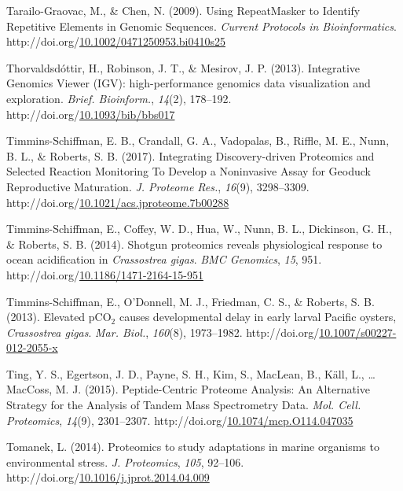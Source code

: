 \documentclass [11pt, proquest] {uwthesis}[2015/03/03]
\newlength{\cslhangindent}
\newenvironment{CSLReferences}%
{\setlength{\parindent}{0pt}%
\everypar{\setlength{\hangindent}{\cslhangindent}}\ignorespaces}%
{\par}
\begin{document}
\begin{CSLReferences}{1}{0}
\leavevmode\hypertarget{ref-Tarailo-Graovac2009}{}%
Tarailo-Graovac, M., \& Chen, N. (2009). {Using RepeatMasker to Identify Repetitive Elements in Genomic Sequences}. \emph{Current Protocols in Bioinformatics}. http://doi.org/\href{https://doi.org/10.1002/0471250953.bi0410s25}{10.1002/0471250953.bi0410s25}

\leavevmode\hypertarget{ref-Thorvaldsdottir2013}{}%
Thorvaldsdóttir, H., Robinson, J. T., \& Mesirov, J. P. (2013). {Integrative Genomics Viewer (IGV): high-performance genomics data visualization and exploration}. \emph{Brief. Bioinform.}, \emph{14}(2), 178--192. http://doi.org/\href{https://doi.org/10.1093/bib/bbs017}{10.1093/bib/bbs017}

\leavevmode\hypertarget{ref-Timmins-Schiffman2017}{}%
Timmins-Schiffman, E. B., Crandall, G. A., Vadopalas, B., Riffle, M. E., Nunn, B. L., \& Roberts, S. B. (2017). {Integrating Discovery-driven Proteomics and Selected Reaction Monitoring To Develop a Noninvasive Assay for Geoduck Reproductive Maturation}. \emph{J. Proteome Res.}, \emph{16}(9), 3298--3309. http://doi.org/\href{https://doi.org/10.1021/acs.jproteome.7b00288}{10.1021/acs.jproteome.7b00288}

\leavevmode\hypertarget{ref-Timmins-Schiffman2014}{}%
Timmins-Schiffman, E., Coffey, W. D., Hua, W., Nunn, B. L., Dickinson, G. H., \& Roberts, S. B. (2014). {Shotgun proteomics reveals physiological response to ocean acidification in \emph{Crassostrea gigas}}. \emph{BMC Genomics}, \emph{15}, 951. http://doi.org/\href{https://doi.org/10.1186/1471-2164-15-951}{10.1186/1471-2164-15-951}

\leavevmode\hypertarget{ref-Timmins-Schiffman2013}{}%
Timmins-Schiffman, E., O'Donnell, M. J., Friedman, C. S., \& Roberts, S. B. (2013). {Elevated {pCO\(_2\)} causes developmental delay in early larval Pacific oysters, \emph{Crassostrea gigas}}. \emph{Mar. Biol.}, \emph{160}(8), 1973--1982. http://doi.org/\href{https://doi.org/10.1007/s00227-012-2055-x}{10.1007/s00227-012-2055-x}

\leavevmode\hypertarget{ref-Ting2015}{}%
Ting, Y. S., Egertson, J. D., Payne, S. H., Kim, S., MacLean, B., Käll, L., \ldots{} MacCoss, M. J. (2015). {Peptide-Centric Proteome Analysis: An Alternative Strategy for the Analysis of Tandem Mass Spectrometry Data}. \emph{Mol. Cell. Proteomics}, \emph{14}(9), 2301--2307. http://doi.org/\href{https://doi.org/10.1074/mcp.O114.047035}{10.1074/mcp.O114.047035}

\leavevmode\hypertarget{ref-Tomanek2014}{}%
Tomanek, L. (2014). {Proteomics to study adaptations in marine organisms to environmental stress}. \emph{J. Proteomics}, \emph{105}, 92--106. http://doi.org/\href{https://doi.org/10.1016/j.jprot.2014.04.009}{10.1016/j.jprot.2014.04.009}


\end{CSLReferences}
\end{document}
